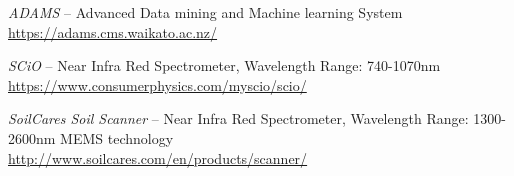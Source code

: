 %

\begin{thebibliography}{999}

		\textit{ADAMS} -- Advanced Data mining and Machine learning System \\
		\url{https://adams.cms.waikato.ac.nz/}{}

		\textit{SCiO} -- Near Infra Red Spectrometer, Wavelength Range: 740-1070nm \\
		\url{https://www.consumerphysics.com/myscio/scio/}{}

		\textit{SoilCares Soil Scanner} -- Near Infra Red Spectrometer,
		Wavelength Range: 1300-2600nm MEMS technology \\
		\url{http://www.soilcares.com/en/products/scanner/}{}

\end{thebibliography}
